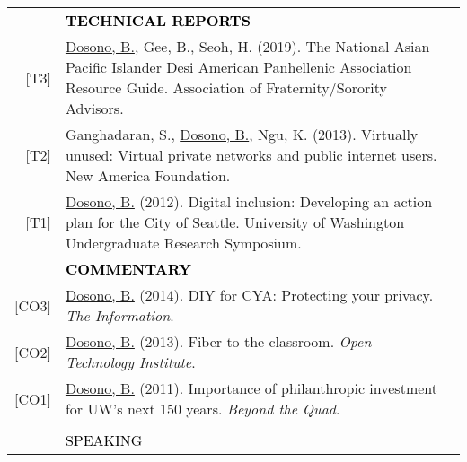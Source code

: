 \documentclass[11pt]{article}
\begin{document}
{{\begin{longtable}{Rp{0.75in}p{5.0in}}
& \textcolor{black}{\uppercase{\textbf{Technical Reports}}}\\


\footnotesize{[T3]} & \href{https://cdn.ymaws.com/www.afa1976.org/resource/resmgr/guides/afa-2019-resourceguide-napa-.pdf}{{Dosono, B.}}, Gee, B., Seoh, H. (2019). The National Asian Pacific Islander Desi American Panhellenic Association Resource Guide. Association of Fraternity/Sorority Advisors.\\

\footnotesize{[T2]} & Ganghadaran, S., \href{https://www.newamerica.org/oti/policy-papers/virtually-unused/}{{Dosono, B.}}, Ngu, K. (2013). Virtually unused: Virtual private networks and public internet users. New America Foundation.\\

\footnotesize{[T1]} & \href{https://expo.uw.edu/expo/apply/238/proceedings/offering_session?id=431}{{Dosono, B.}} (2012). Digital inclusion: Developing an action plan for the City of Seattle. University of Washington Undergraduate Research Symposium.\\

& \textcolor{black}{\uppercase{\textbf{Commentary}}}\\
\footnotesize{[CO3]} & \href{https://theinformation.ischool.uw.edu/wp/2014/04/diy-for-cya-protecting-your-privacy/}{{Dosono, B.}} (2014). DIY for CYA: Protecting your privacy. \textit{The Information}.\\

\footnotesize{[CO2]} & \href{https://www.newamerica.org/oti/blog/fiber-to-the-classroom/}{{Dosono, B.}} (2013). Fiber to the classroom. \textit{Open Technology Institute}.\\

\footnotesize{[CO1]} & \href{https://uwartsci.wordpress.com/2011/11/25/importance-of-philanthropic-investment-for-the-next-150/}{{Dosono, B.}} (2011). 
Importance of philanthropic investment for UW's next 150 years. \textit{Beyond the Quad}.\\
\\

\sout{\hfill} 
& \par \Large \textcolor{black}{\uppercase{Speaking\hspace{6pt} \sout{\hfill}}}\\


\end{longtable}}}
\end{document}
